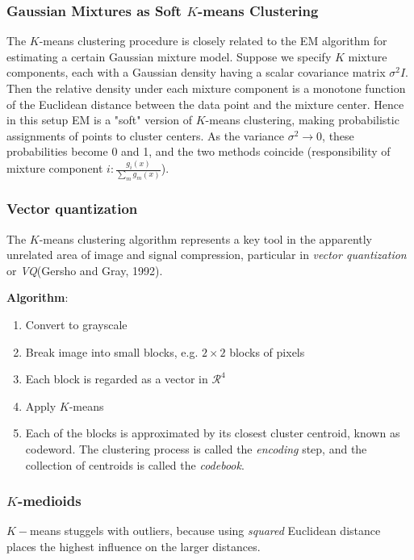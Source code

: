 \documentclass{scrartcl}
\begin{document}
\subsubsection{Gaussian Mixtures as Soft \(K\)-means Clustering}
The \(K\)-means clustering procedure is closely related to the EM algorithm for estimating a certain Gaussian mixture model. Suppose we specify \(K\) mixture components, each with a Gaussian density having a scalar covariance matrix \(\sigma^2 I\). Then the relative density under each mixture component is a monotone function of the Euclidean distance between the data point and the mixture center. Hence in this setup EM is a "soft" version of \(K\)-means clustering, making probabilistic assignments of points to cluster centers. As the variance \(\sigma^2 \rightarrow 0\), these probabilities become 0 and 1, and the two methods coincide (responsibility of mixture component \(i: \frac{g_i(x)}{\sum_m g_m(x)}\)).

\subsubsection{Vector quantization}
The \(K\)-means clustering algorithm represents a key tool in the apparently unrelated area of image and signal compression, particular in \textit{vector quantization} or \textit{VQ}(Gersho and Gray, 1992). 

\textbf{Algorithm}:
\begin{enumerate}
    \item
        Convert to grayscale
    \item
        Break image into small blocks, e.g. \(2 \times 2\) blocks of pixels
    \item
        Each block is regarded as a vector in \(\mathcal{R}^4\)
    \item
        Apply \(K\)-means
    \item
        Each of the blocks is approximated by its closest cluster centroid, known as codeword. The clustering process is called the \textit{encoding} step, and the collection of centroids is called the \textit{codebook}.
\end{enumerate}

\subsubsection{\(K\)-medioids}
 \(K-\)means stuggels with outliers, because using \textit{squared} Euclidean distance places the highest influence on the larger distances.
\end{document}
